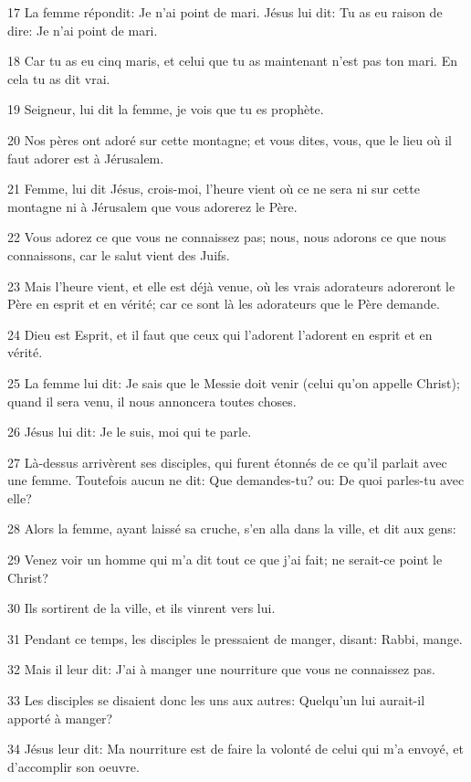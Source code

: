 \par 17 La femme répondit: Je n'ai point de mari. Jésus lui dit: Tu as eu raison de dire: Je n'ai point de mari.
\par 18 Car tu as eu cinq maris, et celui que tu as maintenant n'est pas ton mari. En cela tu as dit vrai.
\par 19 Seigneur, lui dit la femme, je vois que tu es prophète.
\par 20 Nos pères ont adoré sur cette montagne; et vous dites, vous, que le lieu où il faut adorer est à Jérusalem.
\par 21 Femme, lui dit Jésus, crois-moi, l'heure vient où ce ne sera ni sur cette montagne ni à Jérusalem que vous adorerez le Père.
\par 22 Vous adorez ce que vous ne connaissez pas; nous, nous adorons ce que nous connaissons, car le salut vient des Juifs.
\par 23 Mais l'heure vient, et elle est déjà venue, où les vrais adorateurs adoreront le Père en esprit et en vérité; car ce sont là les adorateurs que le Père demande.
\par 24 Dieu est Esprit, et il faut que ceux qui l'adorent l'adorent en esprit et en vérité.
\par 25 La femme lui dit: Je sais que le Messie doit venir (celui qu'on appelle Christ); quand il sera venu, il nous annoncera toutes choses.
\par 26 Jésus lui dit: Je le suis, moi qui te parle.
\par 27 Là-dessus arrivèrent ses disciples, qui furent étonnés de ce qu'il parlait avec une femme. Toutefois aucun ne dit: Que demandes-tu? ou: De quoi parles-tu avec elle?
\par 28 Alors la femme, ayant laissé sa cruche, s'en alla dans la ville, et dit aux gens:
\par 29 Venez voir un homme qui m'a dit tout ce que j'ai fait; ne serait-ce point le Christ?
\par 30 Ils sortirent de la ville, et ils vinrent vers lui.
\par 31 Pendant ce temps, les disciples le pressaient de manger, disant: Rabbi, mange.
\par 32 Mais il leur dit: J'ai à manger une nourriture que vous ne connaissez pas.
\par 33 Les disciples se disaient donc les uns aux autres: Quelqu'un lui aurait-il apporté à manger?
\par 34 Jésus leur dit: Ma nourriture est de faire la volonté de celui qui m'a envoyé, et d'accomplir son oeuvre.
